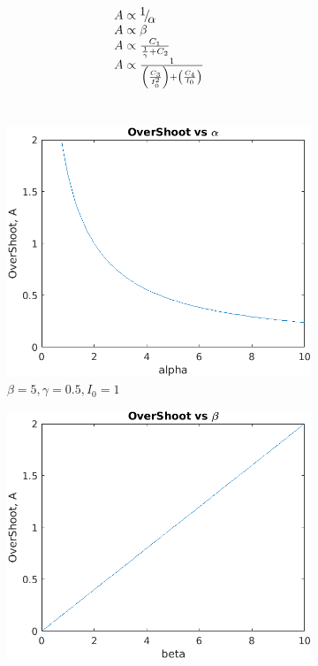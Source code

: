 \[\begin{array}{l}
A \propto {\raise0.7ex\hbox{$1$} \!\mathord{\left/
 {\vphantom {1 \alpha }}\right.\kern-\nulldelimiterspace}
\!\lower0.7ex\hbox{$\alpha $}}\\
A \propto \beta \\
A \propto \frac{C_1}{\frac{1}{\gamma}+C_2} \\
A \propto \frac{1}{{\left( {\frac{{{C_3}}}{{I_0^2}}} \right) + \left( {\frac{{{C_4}}}{{{I_0}}}} \right)}}
\end{array}\]
\\
\begin{figure}[h]
     \centering
     \begin{subfigure}[b]{0.4\textwidth}
         \centering
         \includegraphics[width=\textwidth]{picture/Figure_1-2alpha.png}
         \caption{$\beta = 5, \gamma = 0.5, I_0 = 1$}
         \label{fig:y equals x}
     \end{subfigure}
     \begin{subfigure}[b]{0.4\textwidth}
         \centering
         \includegraphics[width=\textwidth]{picture/Figure_1-2beta.png}

\end{subfigure}
\end{figure}
